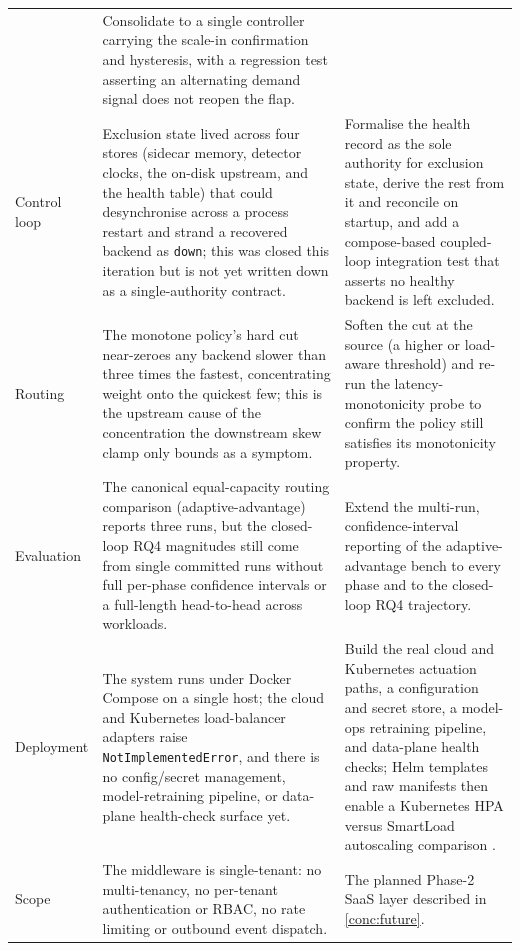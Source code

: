 \begin{table}[H]
\begin{tabularx}{\linewidth}{@{}p{2.0cm} Y Y@{}}
      & Consolidate to a single controller carrying the scale-in confirmation and
        hysteresis, with a regression test asserting an alternating demand signal does not
        reopen the flap. \\
    \addlinespace
    Control loop
      & Exclusion state lived across four stores (sidecar memory, detector clocks, the
        on-disk upstream, and the health table) that could desynchronise across a process
        restart and strand a recovered backend as \texttt{down}; this was closed this
        iteration but is not yet written down as a single-authority contract.
      & Formalise the health record as the sole authority for exclusion state, derive the
        rest from it and reconcile on startup, and add a compose-based coupled-loop
        integration test that asserts no healthy backend is left excluded. \\
    \addlinespace
    Routing
      & The monotone policy's hard cut near-zeroes any backend slower than three times the
        fastest, concentrating weight onto the quickest few; this is the upstream cause of
        the concentration the downstream skew clamp only bounds as a symptom.
      & Soften the cut at the source (a higher or load-aware threshold) and re-run the
        latency-monotonicity probe to confirm the policy still satisfies its monotonicity
        property. \\
    \addlinespace
    Evaluation
      & The canonical equal-capacity routing comparison (adaptive-advantage) reports three
        runs, but the closed-loop RQ4 magnitudes still come from single committed runs
        without full per-phase confidence intervals or a full-length head-to-head across
        workloads.
      & Extend the multi-run, confidence-interval reporting of the adaptive-advantage bench
        to every phase and to the closed-loop RQ4 trajectory. \\
    \addlinespace
    Deployment
      & The system runs under Docker Compose on a single host; the cloud and Kubernetes
        load-balancer adapters raise \texttt{NotImplementedError}, and there is no
        config/secret management, model-retraining pipeline, or data-plane health-check
        surface yet.
      & Build the real cloud and Kubernetes actuation paths, a configuration and secret
        store, a model-ops retraining pipeline, and data-plane health checks; Helm
        templates and raw manifests then enable a Kubernetes HPA versus SmartLoad
        autoscaling comparison \cite{k8shpa}. \\
    \addlinespace
    Scope
      & The middleware is single-tenant: no multi-tenancy, no per-tenant
        authentication or RBAC, no rate limiting or outbound event dispatch.
      & The planned Phase-2 SaaS layer described in \cref{conc:future}. \\
    \bottomrule
  \end{tabularx}
\end{table}

